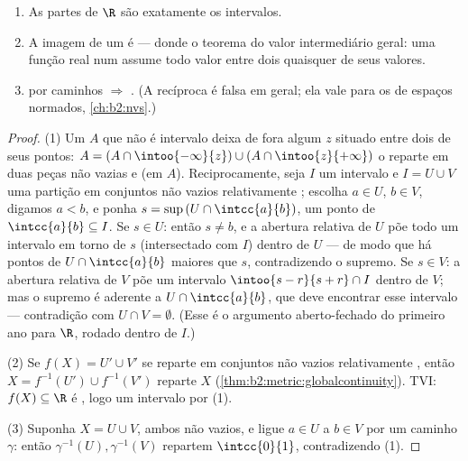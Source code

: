 \begin{theorem}\label{thm:b2:metric:connectedness}
\begin{enumerate}
  \item As partes  de $\R$ são exatamente os intervalos.
  \item A imagem  de um  é  ---
        donde o teorema do valor intermediário geral: uma função
        real  num  assume todo valor entre
        dois quaisquer de seus valores.
  \item {} por caminhos $\Rightarrow$ . (A recíproca é falsa
        em geral; ela vale para os  de espaços normados,
        \cref{ch:b2:nvs}.)
\end{enumerate}
\end{theorem}

\begin{proof}
(1) Um $A$ que não é intervalo deixa de fora algum $z$ situado entre dois de seus pontos:
$A = (A \cap \intoo{-\infty}{z}) \cup (A \cap \intoo{z}{+\infty})$
o reparte em duas peças não vazias e  (em $A$). Reciprocamente, seja
$I$ um intervalo e $I = U \cup V$ uma partição em conjuntos não vazios
relativamente ; escolha $a \in U$, $b \in V$, digamos $a < b$, e
ponha $s = \sup\,(U \cap \intcc{a}{b})$, um ponto de $\intcc{a}{b}
\subseteq I$. Se $s \in U$: então $s \neq b$, e a abertura relativa
de $U$ põe todo um intervalo em torno de $s$ (intersectado com $I$)
dentro de $U$ --- de modo que há pontos de $U \cap \intcc{a}{b}$ maiores que $s$,
contradizendo o supremo. Se $s \in V$: a abertura relativa de $V$
põe um intervalo $\intoo{s - r}{s + r} \cap I$ dentro de $V$; mas o
supremo é aderente a $U \cap \intcc{a}{b}$, que deve encontrar esse
intervalo --- contradição com $U \cap V = \emptyset$. (Esse é
o argumento aberto-fechado do primeiro ano para $\R$, rodado dentro de $I$.)

(2) Se $f(X) = U' \cup V'$ se reparte em conjuntos não vazios relativamente
, então $X = f^{-1}(U') \cup f^{-1}(V')$ reparte $X$
(\cref{thm:b2:metric:globalcontinuity}). TVI: $f(X) \subseteq \R$
é , logo um intervalo por (1).

(3) Suponha $X = U \cup V$, ambos  não vazios, e ligue $a \in U$
a $b \in V$ por um caminho $\gamma$: então $\gamma^{-1}(U),
\gamma^{-1}(V)$ repartem $\intcc{0}{1}$, contradizendo (1).
\end{proof}

